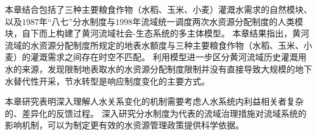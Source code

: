 本章结合包括了三种主要粮食作物（水稻、玉米、小麦）灌溉水需求的自然模块、以及$1987$年“八七”分水制度与$1998$年流域统一调度两次水资源分配制度的人类模块，自下而上构建了黄河流域社会-生态系统的多主体模型。
本章结果指出，黄河流域的水资源分配制度所规定的地表水额度与三种主要粮食作物（水稻、玉米、小麦）的灌溉需求之间存在时空不匹配。
利用模型进一步区分黄河流域历史灌溉用水的来源，发现限制地表取水的水资源分配制度限制并没有直接导致大规模的地下水替代性开采，节水转型是响应制度变化的主要方式。

本章研究表明深入理解人水关系变化的机制需要考虑人水系统内利益相关者复杂的、差异化的反馈过程。
深入研究分水制度为代表的流域治理措施对流域系统的影响机制，可以为制定更有效的水资源管理政策提供科学依据。
